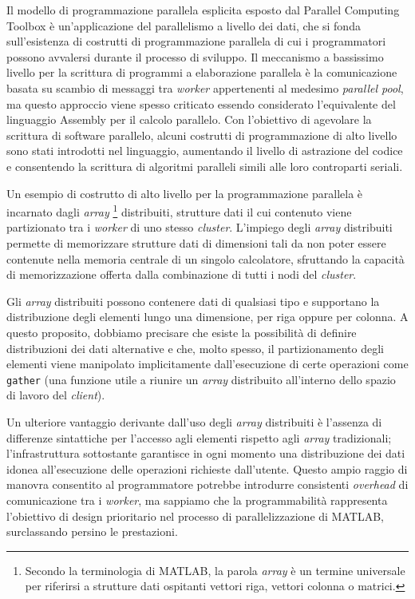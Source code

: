 Il modello di programmazione parallela esplicita esposto dal Parallel Computing Toolbox \`e un'applicazione del parallelismo a livello dei dati, che si fonda sull'esistenza di costrutti di programmazione 
parallela di cui i programmatori possono avvalersi durante il processo di sviluppo.\newline
Il meccanismo a bassissimo livello per la scrittura di programmi a elaborazione parallela \`e la comunicazione basata su scambio di messaggi tra \textit{worker} 
appertenenti al medesimo \textit{parallel pool}, ma questo approccio viene spesso criticato essendo considerato l'equivalente del linguaggio 
Assembly per il calcolo parallelo.\newline
Con l'obiettivo di agevolare la scrittura di software parallelo, alcuni costrutti di programmazione di alto livello sono stati introdotti nel linguaggio, aumentando il livello di 
astrazione del codice e consentendo la scrittura di algoritmi paralleli simili alle loro controparti seriali.

Un esempio di costrutto di alto livello per la programmazione parallela \`e incarnato dagli \textit{array}
\footnote{Secondo la terminologia di MATLAB, la parola \textit{array} \`e un termine universale per riferirsi a strutture dati ospitanti vettori riga, vettori colonna o matrici.} 
distribuiti, strutture dati il cui contenuto viene partizionato tra i \textit{worker} di uno stesso \textit{cluster}.\newline
L'impiego degli \textit{array} distribuiti permette di memorizzare strutture dati di dimensioni tali da non poter essere contenute nella memoria centrale di un 
singolo calcolatore, sfruttando la capacit\`a di memorizzazione offerta dalla combinazione di tutti i nodi del \textit{cluster}.

Gli \textit{array} distribuiti possono contenere dati di qualsiasi tipo e supportano la distribuzione degli elementi lungo una dimensione,  
per riga oppure per colonna.\newline
A questo proposito, dobbiamo precisare che esiste la possibilit\`a di definire distribuzioni dei dati alternative e che, molto spesso, il partizionamento degli elementi viene manipolato implicitamente dall'esecuzione di certe operazioni 
come \lstinline|gather| (una funzione utile a riunire un \textit{array} distribuito all'interno dello spazio di lavoro del \textit{client}).

Un ulteriore vantaggio derivante dall'uso degli \textit{array} distribuiti \`e l'assenza di differenze sintattiche per l'accesso agli elementi rispetto agli \textit{array} tradizionali; l'infrastruttura sottostante garantisce in ogni momento una distribuzione dei dati idonea all'esecuzione delle operazioni 
richieste dall'utente.\newline
Questo ampio raggio di manovra consentito al programmatore potrebbe introdurre consistenti \textit{overhead} di comunicazione tra i \textit{worker}, 
ma sappiamo che la programmabilit\`a rappresenta l'obiettivo di design prioritario nel processo di parallelizzazione di MATLAB, surclassando persino le prestazioni.

